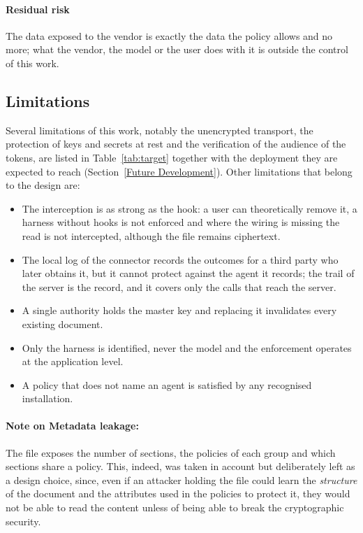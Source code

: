 \paragraph{Residual risk} The data exposed to the vendor is exactly the data the policy allows and no more; what the vendor, the model or the user does with it is outside the control of this work.

\subsection{Limitations}
Several limitations of this work, notably the unencrypted transport, the protection of keys and secrets at rest and the verification of the audience of the tokens, are listed in Table~\ref{tab:target} together with the deployment they are expected to reach (Section~\ref{Future Development}).
Other limitations that belong to the design are:
\begin{itemize}
  \item The interception is as strong as the hook: a user can theoretically remove it, a harness without hooks is not enforced and where the wiring is missing the read is not intercepted, although the file remains ciphertext.
  \item The local log of the connector records the outcomes for a third party who later obtains it, but it cannot protect against the agent it records; the trail of the server is the record, and it covers only the calls that reach the server.
  \item A single authority holds the master key and replacing it invalidates every existing document.
  \item Only the harness is identified, never the model and the enforcement operates at the application level.
  \item A policy that does not name an agent is satisfied by any recognised installation.
\end{itemize}

\paragraph{Note on Metadata leakage:}
The  file exposes the number of sections, the policies of each group and which sections share a policy. This, indeed, was taken in account but deliberately left as a design choice, since, even if an attacker holding the file could learn the \emph{structure} of the document and the attributes used in the policies to protect it, they would not be able to read the content unless of being able to break the cryptographic security.

